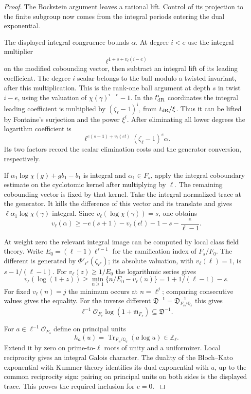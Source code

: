 \begin{proof}
The Bockstein argument leaves a rational lift. Control of its projection to the finite subgroup now comes from the integral periods entering the dual exponential.

The displayed integral congruence bounds \(\alpha\).
At degree \(i<e\) use the integral multiplier
\[
 \ell^{1+s+v_\ell(i-e)}
\]
on the modified cobounding vector, then subtract an integral lift of its leading coefficient.
The degree \(i\) scalar belongs to the ball
modulo a twisted invariant, after this multiplication.
This is the rank-one ball argument at depth \(s\)
in twist \(i-e\), using the valuation of
\(\chi(\gamma)^{i-e}-1\).
In the \(t_{\rm dR}^i\) coordinates the integral
leading coefficient is multiplied by
\((\zeta_\ell-1)^i\), from \(t_{\rm dR}/\xi\).
Thus it can be lifted by Fontaine's surjection
and the power \(\xi^i\).
After eliminating all lower degrees the logarithm coefficient is
\[
 \ell^{e(s+1)+v_\ell(e!)}(\zeta_\ell-1)^e\alpha.
\]
Its two factors record the scalar elimination costs and the generator conversion, respectively.

If \(\alpha_1\log\chi(g)+g b_1-b_1\) is integral
and \(\alpha_1\in F_s\), apply the integral
coboundary estimate on the cyclotomic kernel
after multiplying by \(\ell\).
The remaining cobounding vector is fixed by that
kernel. Take the integral normalized trace at the
generator. It kills the difference of this
vector and its translate and gives
\(\ell\alpha_1\log\chi(\gamma)\) integral.
Since \(v_\ell(\log\chi(\gamma))=s\), one obtains
\[
 v_\ell(\alpha)\ge
 -e(s+1)-v_\ell(e!)-1-s-\frac{e}{\ell-1}.
\]

At weight zero the relevant integral image can be computed by local class field theory. Write \(E_0=(\ell-1)\ell^{s-1}\) for the ramification index of \(F_s/F_0\). The different is generated by \(\Phi'_{\ell^s}(\zeta_{\ell^s})\); its absolute valuation, with \(v_\ell(\ell)=1\), is \(s-1/(\ell-1)\). For \(v_\ell(z)\ge1/E_0\) the logarithmic series gives
\[
 v_\ell(\log(1+z))\ge \min_{n\ge1}\{n/E_0-v_\ell(n)\}
                  =1+1/(\ell-1)-s .
\]
For fixed \(v_\ell(n)=j\) the minimum occurs at \(n=\ell^j\); comparing consecutive values gives the equality. For the inverse different \(\mathfrak D^{-1}=\mathfrak D_{F_s/\mathbb Q_\ell}^{-1}\) this gives
\[
          \ell^{-1}\mathcal O_{F_s}\log(1+\mathfrak m_{F_s})
                              \subseteq\mathfrak D^{-1}.
\]

For \(a\in\ell^{-1}\mathcal O_{F_s}\) define on principal units
\[
       h_a(u)=\operatorname{Tr}_{F_s/\mathbb Q_\ell}(a\log u)\in\mathbb Z_\ell .
\]
Extend it by zero on prime-to-\(\ell\) roots of unity and a uniformizer. Local reciprocity gives an integral Galois character. The duality of the Bloch--Kato exponential with Kummer theory identifies its dual exponential with \(a\), up to the common reciprocity sign: pairing on principal units on both sides is the displayed trace. This proves the required inclusion for \(e=0\). \cite[Section~3]{bloch-kato-finite}


\end{proof}
